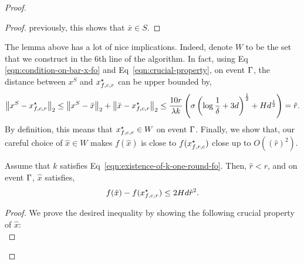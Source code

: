 \begin{proof}
\begin{proof}
previously, this shows that $\bar{x} \in S$. 
\end{proof}
The lemma above has a lot of nice implications. Indeed, denote $W$ to be the 
set that we construct in the $6$th line of the algorithm. In fact, using Eq
\eqref{eqn:condition-on-bar-x-fo} and Eq~\eqref{eqn:crucial-property}, on 
event $\Gamma$, the distance between $x^S$ and $x_{f, c, r}^\star$ can be upper 
bounded by, 
\begin{equation*}
\left\|{x^S - x_{f, c, r}^\star}\right\|_2 \leq \left\|{x^S - \bar{x}}\right\|_2 + \left\|{\bar{x} - x_{f, c, r}^\star}\right\|_2
	\leq  \frac{10r}{\lambda k}\left(\sigma \left(\log \frac{1}{\delta} + 3d\right)^{\frac{1}{2}} 
		+ Hd^{\frac{1}{2}} \right) = \hat{r}.
\end{equation*}
By definition, this means that $x_{f, c, r}^\star \in W$ on event $\Gamma$. 
Finally, we show that, our careful choice of $\hat{x} \in W$ makes $f(\hat{x})$ 
is close to $f(x_{f, r, c}^\star)$ close up to $O((\hat{r})^2)$. 
\begin{lemma}
\label{lemma:careful-choice-of-estimator}
Assume that $k$ satisfies Eq~\eqref{eqn:existence-of-k-one-round-fo}. 
Then, $\hat{r} < r$, and on event $\Gamma$, 
$\hat{x}$ satisfies, 
\begin{equation*}
f(\hat{x}) - f(x_{f, c, r}^\star) \leq 2 Hd \hat{r}^2.
\end{equation*}
\end{lemma}
\begin{proof}
We prove the desired inequality by showing the following crucial property of 
$\hat{x}$: 
\begin{equation}

\end{equation}
\end{proof}
\end{proof}
